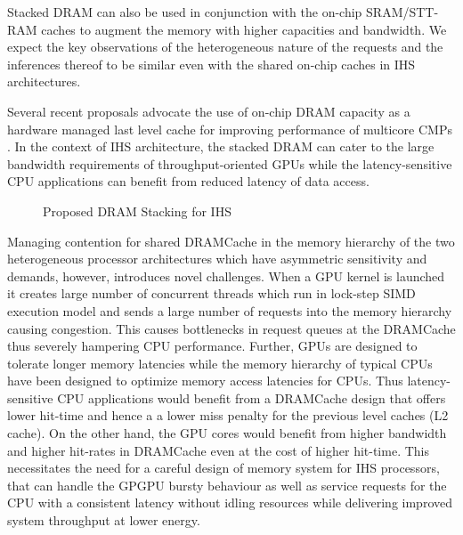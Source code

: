 \par Stacked DRAM can also be used in conjunction with the on-chip SRAM/STT-RAM caches to augment the memory with higher capacities and bandwidth. We expect the key observations of the heterogeneous nature of the requests and the inferences thereof to be similar even with the shared on-chip caches in IHS architectures.
\par Several recent proposals advocate the use of on-chip DRAM capacity as a hardware managed last level cache for improving performance of multicore CMPs \cite{alloy,bimodal,loh-hill,atcache}. In the context of IHS architecture, the stacked DRAM can cater to the large bandwidth requirements of throughput-oriented GPUs while the latency-sensitive CPU applications can benefit from reduced latency of data access. 

\begin{figure}[!htb]
	\centering
	\def\svgwidth{0.5\columnwidth}
	
	\caption{Proposed DRAM Stacking for IHS}
	\label{fig:stackdram}
\end{figure}
\par Managing contention for shared DRAMCache in the memory hierarchy of the two heterogeneous processor architectures which have asymmetric sensitivity and demands, however, introduces novel challenges. When a GPU kernel is launched it creates large number of concurrent threads which run in lock-step SIMD execution model and sends a large number of requests into the memory hierarchy causing congestion. This causes bottlenecks in request queues at the DRAMCache thus severely hampering CPU performance. Further, GPUs are designed to tolerate longer memory latencies while the memory hierarchy of typical CPUs have been designed to optimize memory access latencies for CPUs. 
Thus latency-sensitive CPU applications would benefit from a DRAMCache design that offers lower hit-time and hence a a lower miss penalty for the previous level caches (L2 cache). On the other hand, the GPU cores would benefit from higher bandwidth and higher hit-rates in DRAMCache even at the cost of higher hit-time. This necessitates the need for a careful design of memory system for IHS processors, that can handle the GPGPU bursty behaviour as well as service requests for the CPU with a consistent latency without idling resources while delivering improved system throughput at lower energy.
